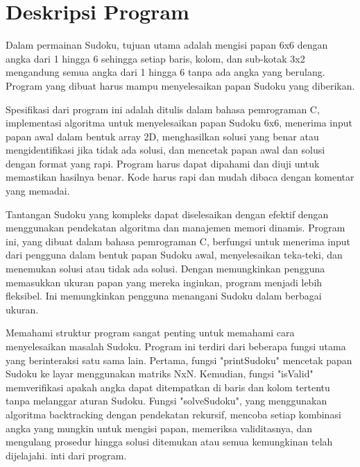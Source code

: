 \documentclass{article}
\begin{document}
\section{Deskripsi Program}
\par{Dalam permainan Sudoku, tujuan utama adalah mengisi papan 6x6 dengan angka dari 1 hingga 6 sehingga setiap baris, kolom, dan sub-kotak 3x2 mengandung semua angka dari 1 hingga 6 tanpa ada angka yang berulang. Program yang dibuat harus mampu menyelesaikan papan Sudoku yang diberikan.}
\par\null\par
\par{Spesifikasi dari program ini adalah ditulis dalam bahasa pemrograman C, implementasi algoritma untuk menyelesaikan papan Sudoku 6x6, menerima input papan awal dalam bentuk array 2D, menghasilkan solusi yang benar atau mengidentifikasi jika tidak ada solusi, dan mencetak papan awal dan solusi dengan format yang rapi. Program harus dapat dipahami dan diuji untuk memastikan hasilnya benar. Kode harus rapi dan mudah dibaca dengan komentar yang memadai.}
\par\null\par
\par{Tantangan Sudoku yang kompleks dapat diselesaikan dengan efektif dengan menggunakan pendekatan algoritma dan manajemen memori dinamis. Program ini, yang dibuat dalam bahasa pemrograman C, berfungsi untuk menerima input dari pengguna dalam bentuk papan Sudoku awal, menyelesaikan teka-teki, dan menemukan solusi atau tidak ada solusi. Dengan memungkinkan pengguna memasukkan ukuran papan yang mereka inginkan, program menjadi lebih fleksibel. Ini memungkinkan pengguna menangani Sudoku dalam berbagai ukuran.}
\par\null\par
\par{Memahami struktur program sangat penting untuk memahami cara menyelesaikan masalah Sudoku. Program ini terdiri dari beberapa fungsi utama yang berinteraksi satu sama lain. Pertama, fungsi "printSudoku" mencetak papan Sudoku ke layar menggunakan matriks NxN. Kemudian, fungsi "isValid" memverifikasi apakah angka dapat ditempatkan di baris dan kolom tertentu tanpa melanggar aturan Sudoku. Fungsi "solveSudoku", yang menggunakan algoritma backtracking dengan pendekatan rekursif, mencoba setiap kombinasi angka yang mungkin untuk mengisi papan, memeriksa validitasnya, dan mengulang prosedur hingga solusi ditemukan atau semua kemungkinan telah dijelajahi. inti dari program.}
\par\null\par
\end{document}
